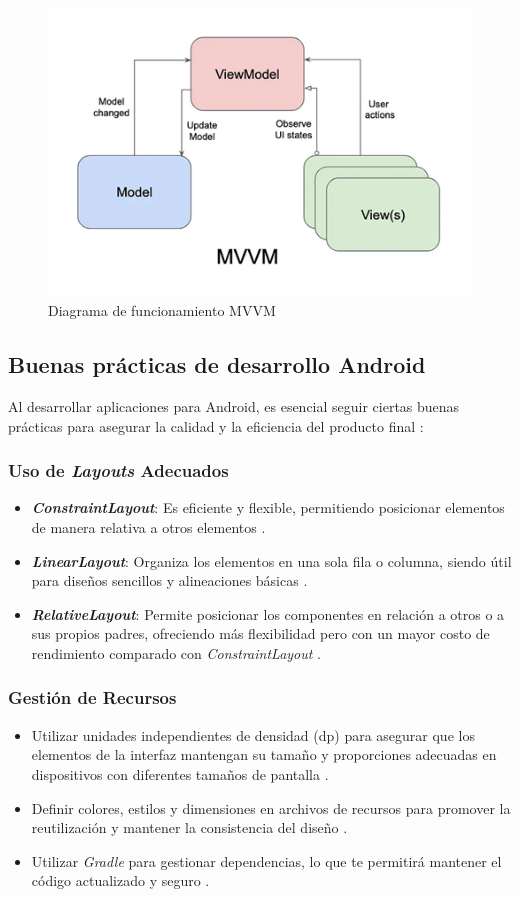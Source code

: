 \begin{figure} [H]
    \centering
    \includegraphics[width=0.5\linewidth]{figuras/mvvm.png}
    \caption{Diagrama de funcionamiento MVVM}
    \label{fig:enter-label}
\end{figure}

\subsection{Buenas prácticas de desarrollo Android}
Al desarrollar aplicaciones para Android, es esencial seguir ciertas buenas prácticas para asegurar la calidad y la eficiencia del producto final \cite{PhillipsStewart2022}:

\subsubsection{Uso de \textit{Layouts} Adecuados}
\begin{itemize}
    \item \textbf{\textit{ConstraintLayout}}: Es eficiente y flexible, permitiendo posicionar elementos de manera relativa a otros elementos \cite{PhillipsStewart2022}.
    \item \textbf{\textit{LinearLayout}}: Organiza los elementos en una sola fila o columna, siendo útil para diseños sencillos y alineaciones básicas \cite{PhillipsStewart2022}.
    \item \textbf{\textit{RelativeLayout}}: Permite posicionar los componentes en relación a otros o a sus propios padres, ofreciendo más flexibilidad pero con un mayor costo de rendimiento comparado con \textit{ConstraintLayout} \cite{PhillipsStewart2022}.
\end{itemize}

\subsubsection{Gestión de Recursos}
\begin{itemize}
    \item Utilizar unidades independientes de densidad (dp) para asegurar que los elementos de la interfaz mantengan su tamaño y proporciones adecuadas en dispositivos con diferentes tamaños de pantalla \cite{PhillipsStewart2022}.
    \item Definir colores, estilos y dimensiones en archivos de recursos para promover la reutilización y mantener la consistencia del diseño \cite{PhillipsStewart2022}.
    \item Utilizar \textit{Gradle} para gestionar dependencias, lo que te permitirá mantener el código actualizado y seguro \cite{PhillipsStewart2022}.
\end{itemize}

